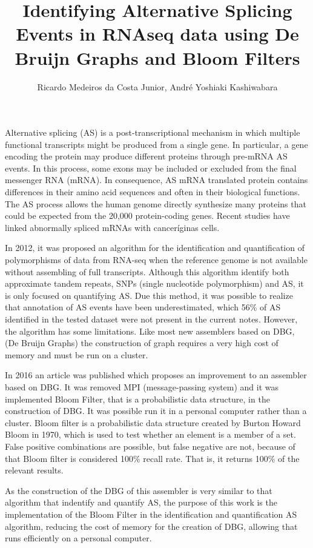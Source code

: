 \documentclass[10pt,twoside]{article}
\title{\vspace{-15mm}\fontsize{24pt}{10pt}\selectfont\textbf{Identifying Alternative Splicing Events in RNAseq data using De Bruijn Graphs and Bloom Filters}} %
\author{Ricardo Medeiros da Costa Junior,
 André Yoshiaki Kashiwabara}
\affil{Universidade Tecnológica Federal do Paraná - Campus Cornélio Procópio, Departamento de Computação, Programa de Pós-Graduação em Bioinformática - PPGBIOINFO}
\date{}
\begin{document}
\maketitle %
\thispagestyle{fancy} %


Alternative splicing (AS) is a post-transcriptional mechanism in which multiple functional transcripts might be produced from a single gene. In particular, a gene encoding the protein may produce different proteins through pre-mRNA AS events. In this process, some exons may be included or excluded from the final messenger RNA (mRNA). In consequence, AS mRNA translated protein contains differences in their amino acid sequences and often in their biological functions. The AS process allows the human genome directly synthesize many proteins that could be expected from the 20,000 protein-coding genes. Recent studies have linked abnormally spliced mRNAs with canceríginas cells.

In 2012, it was proposed an algorithm for the identification and quantification of polymorphisms of data from RNA-seq when the reference genome is not available without assembling of full transcripts. Although this algorithm identify both approximate tandem repeats, SNPs (single nucleotide polymorphism) and AS, it is only focused on quantifying AS. Due this method, it was possible to realize that annotation of AS events have been underestimated, which 56\% of AS identified in the tested dataset were not present in the current notes. However, the algorithm has some limitations. Like most new assemblers based on DBG, (De Bruijn Graphs) the construction of graph requires a very high cost of memory and must be run on a cluster.

In 2016 an article was published which proposes an improvement to an assembler based on DBG. It was removed MPI (message-passing system) and it was implemented Bloom Filter, that is a probabilistic data structure, in the construction of DBG. It was possible run it in a personal computer rather than a cluster. Bloom filter is a probabilistic data structure created by Burton Howard Bloom in 1970, which is used to test whether an element is a member of a set. False positive combinations are possible, but false negative are not, because of that Bloom filter is considered 100\% recall rate. That is, it returns 100\% of the relevant results.

As the construction of the DBG of this assembler is very similar to that algorithm that indentify and quantify AS, the purpose of this work is the implementation of the Bloom Filter in the identification and quantification AS algorithm, reducing the cost of memory for the creation of DBG, allowing that runs efficiently on a personal computer.
\end{document}
